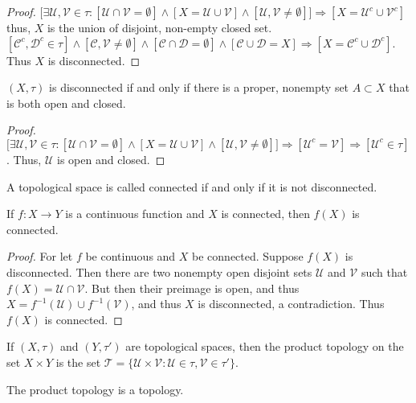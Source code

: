 \documentclass[crop=false,class=book]{standalone}
\begin{document}
\begin{proof}
$\big[\exists \mathcal{U},\mathcal{V}\in \tau: [\mathcal{U}\cap \mathcal{V}=\emptyset]\land [X=\mathcal{U}\cup \mathcal{V}]\land [\mathcal{U},\mathcal{V}\ne \emptyset]\big]\Rightarrow [X = \mathcal{U}^c\cup \mathcal{V}^c]$ thus, $X$ is the union of disjoint, non-empty closed set. $[\mathcal{C}^c,\mathcal{D}^c\in \tau]\land[\mathcal{C},\mathcal{V}\ne\emptyset]\land[\mathcal{C}\cap \mathcal{D}=\emptyset]\land[\mathcal{C}\cup\mathcal{D}=X]\Rightarrow [X=\mathcal{C}^c\cup\mathcal{D}^c].$ Thus $X$ is disconnected.
\end{proof}
\begin{theorem}
$(X,\tau)$ is disconnected if and only if there is a proper, nonempty set $A\subset X$ that is both open and closed.
\end{theorem}
\begin{proof}
$\big[\exists \mathcal{U},\mathcal{V}\in \tau:[\mathcal{U}\cap \mathcal{V}=\emptyset]\land [X=\mathcal{U}\cup\mathcal{V}]\land[\mathcal{U},\mathcal{V}\ne \emptyset]\big]\Rightarrow [\mathcal{U}^c = \mathcal{V}]\Rightarrow [\mathcal{U}^c\in \tau]$. Thus, $\mathcal{U}$ is open and closed.
\end{proof}
\begin{definition}
A topological space is called connected if and only if it is not disconnected.
\end{definition}
\begin{theorem}
If $f:X\rightarrow Y$ is a continuous function and $X$ is connected, then $f(X)$ is connected.
\end{theorem}
\begin{proof}
For let $f$ be continuous and $X$ be connected. Suppose $f(X)$ is disconnected. Then there are two nonempty open disjoint sets $\mathcal{U}$ and $\mathcal{V}$ such that $f(X) = \mathcal{U}\cap \mathcal{V}$. But then their preimage is open, and thus $X=f^{-1}(\mathcal{U})\cup f^{-1}(\mathcal{V})$, and thus $X$ is disconnected, a contradiction. Thus $f(X)$ is connected.
\end{proof}
\begin{definition}
If $(X,\tau)$ and $(Y,\tau')$ are topological spaces, then the product topology on the set $X\times Y$ is the set $\mathscr{T} = \{\mathcal{U}\times \mathcal{V}:\mathcal{U}\in\tau,\mathcal{V}\in \tau'\}$.
\end{definition}
\begin{theorem}
The product topology is a topology.
\end{theorem}
\end{document}
